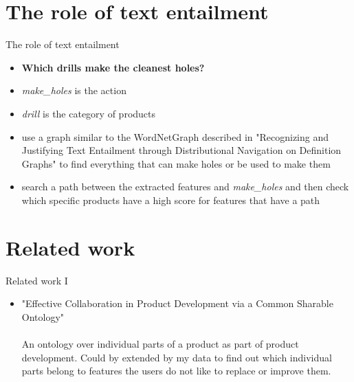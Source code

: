 \documentclass{beamer}
\begin{document}
\section{The role of text entailment}
\begin{frame}{The role of text entailment}
    \begin{itemize}
        \item \textbf{Which drills make the cleanest holes?}
        \item \textit{make\_holes} is the action
        \item \textit{drill} is the category of products
        \item use a graph similar to the WordNetGraph described in "Recognizing and Justifying Text Entailment through Distributional Navigation on Definition Graphs" \cite{silva2018recognizing} to find everything that can make holes or be used to make them
        \item search a path between the extracted features and \textit{make\_holes} and then check which specific products have a high score for features that have a path
    \end{itemize}
\end{frame}

\section{Related work}
\begin{frame}{Related work I}
\begin{itemize}
    \item "Effective Collaboration in Product Development via a Common Sharable Ontology"\\ \cite{mostefai2005effective}\\
    An ontology over individual parts of a product as part of product development. Could by extended by my data to find out which individual parts belong to features the users do not like to replace or improve them.
\end{itemize}
\end{frame}
\end{document}
